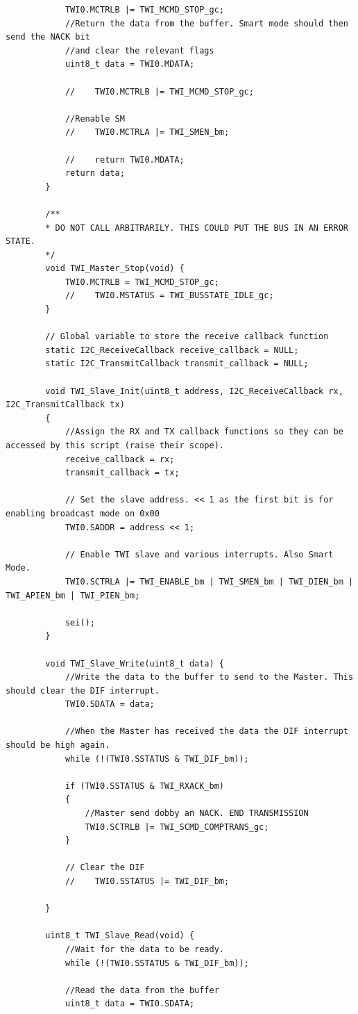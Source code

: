 \documentclass[11pt,a4paper,titlepage]{report}
\begin{document}
\begin{lstlisting}
			TWI0.MCTRLB |= TWI_MCMD_STOP_gc;
			//Return the data from the buffer. Smart mode should then send the NACK bit 
			//and clear the relevant flags
			uint8_t data = TWI0.MDATA;
			
			//    TWI0.MCTRLB |= TWI_MCMD_STOP_gc;
			
			//Renable SM
			//    TWI0.MCTRLA |= TWI_SMEN_bm;
			
			//    return TWI0.MDATA;
			return data;
		}
		
		/**
		* DO NOT CALL ARBITRARILY. THIS COULD PUT THE BUS IN AN ERROR STATE.
		*/
		void TWI_Master_Stop(void) {
			TWI0.MCTRLB = TWI_MCMD_STOP_gc;
			//    TWI0.MSTATUS = TWI_BUSSTATE_IDLE_gc; 
		}
		
		// Global variable to store the receive callback function
		static I2C_ReceiveCallback receive_callback = NULL;
		static I2C_TransmitCallback transmit_callback = NULL;
		
		void TWI_Slave_Init(uint8_t address, I2C_ReceiveCallback rx, I2C_TransmitCallback tx) 
		{
			//Assign the RX and TX callback functions so they can be accessed by this script (raise their scope). 
			receive_callback = rx;
			transmit_callback = tx;
			
			// Set the slave address. << 1 as the first bit is for enabling broadcast mode on 0x00
			TWI0.SADDR = address << 1;
			
			// Enable TWI slave and various interrupts. Also Smart Mode. 
			TWI0.SCTRLA |= TWI_ENABLE_bm | TWI_SMEN_bm | TWI_DIEN_bm | TWI_APIEN_bm | TWI_PIEN_bm;
			
			sei();
		}
		
		void TWI_Slave_Write(uint8_t data) {
			//Write the data to the buffer to send to the Master. This should clear the DIF interrupt. 
			TWI0.SDATA = data;
			
			//When the Master has received the data the DIF interrupt should be high again. 
			while (!(TWI0.SSTATUS & TWI_DIF_bm));
			
			if (TWI0.SSTATUS & TWI_RXACK_bm)
			{
				//Master send dobby an NACK. END TRANSMISSION
				TWI0.SCTRLB |= TWI_SCMD_COMPTRANS_gc;
			}
			
			// Clear the DIF
			//    TWI0.SSTATUS |= TWI_DIF_bm;
			
		}
		
		uint8_t TWI_Slave_Read(void) {
			//Wait for the data to be ready. 
			while (!(TWI0.SSTATUS & TWI_DIF_bm));
			
			//Read the data from the buffer
			uint8_t data = TWI0.SDATA;
			

\end{lstlisting}
\end{document}
